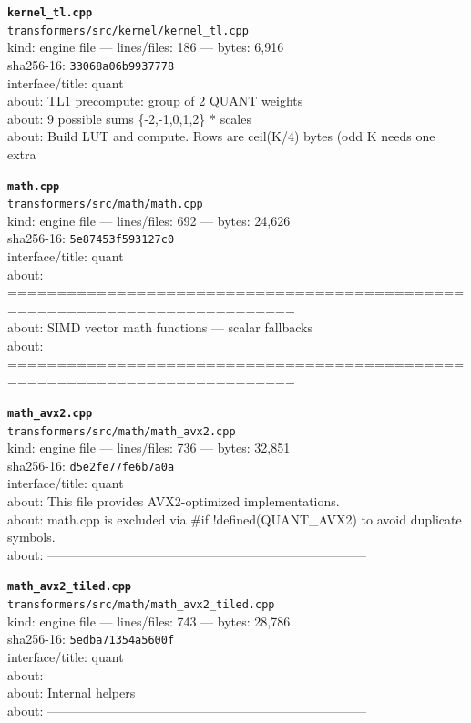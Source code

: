 \noindent\textbf{\texttt{kernel\_tl.cpp}}\\
\texttt{transformers/src/kernel/kernel\_tl.cpp}\\
kind: engine file --- lines/files: 186 --- bytes: 6,916\\
sha256-16: \texttt{33068a06b9937778}\\
interface/title: quant\\
about: TL1 precompute: group of 2 QUANT weights\\
about: 9 possible sums \{-2,-1,0,1,2\} * scales\\
about: Build LUT and compute. Rows are ceil(K/4) bytes (odd K needs one extra\\
\vspace*{6.0pt}

\noindent\textbf{\texttt{math.cpp}}\\
\texttt{transformers/src/math/math.cpp}\\
kind: engine file --- lines/files: 692 --- bytes: 24,626\\
sha256-16: \texttt{5e87453f593127c0}\\
interface/title: quant\\
about: ===========================================================================\\
about: SIMD vector math functions — scalar fallbacks\\
about: ===========================================================================\\
\vspace*{6.0pt}

\noindent\textbf{\texttt{math\_avx2.cpp}}\\
\texttt{transformers/src/math/math\_avx2.cpp}\\
kind: engine file --- lines/files: 736 --- bytes: 32,851\\
sha256-16: \texttt{d5e2fe77fe6b7a0a}\\
interface/title: quant\\
about: This file provides AVX2-optimized implementations.\\
about: math.cpp is excluded via \#if !defined(QUANT\_AVX2) to avoid duplicate symbols.\\
about: ---------------------------------------------------------------------------\\
\vspace*{6.0pt}
\newpage

\noindent\textbf{\texttt{math\_avx2\_tiled.cpp}}\\
\texttt{transformers/src/math/math\_avx2\_tiled.cpp}\\
kind: engine file --- lines/files: 743 --- bytes: 28,786\\
sha256-16: \texttt{5edba71354a5600f}\\
interface/title: quant\\
about: ---------------------------------------------------------------------------\\
about: Internal helpers\\
about: ---------------------------------------------------------------------------\\
\vspace*{6.0pt}

